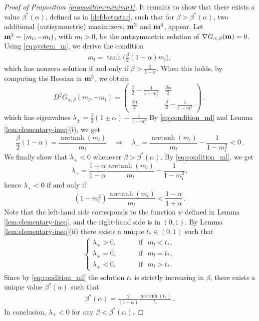 \documentclass[11pt,oneside]{amsart}
\numberwithin{equation}{section}  %
\theoremstyle{plain}
\theoremstyle{remark}
\def \bm {{\bf m}}
\begin{document}
\begin{proof}[Proof of Proposition \ref{proposition:minima1}]
It remains to show that there exists a value $\beta^*(\alpha)$, defined as in \eqref{def:betastar}, such that for $\beta > \beta^*(\alpha)$, two additional (antisymmetric) maximizers, $\bm^3$ and $\bm^4$, appear. 
Let $\bm^3=(m_l,-m_l)$, with $m_l>0$, be the antisymmetric solution of $\nabla G_{\alpha,\beta}(\bm)=0$. Using \eqref{eq:system_m}, we derive the condition
\begin{align}\label{eq:condition_ml}
    m_l=\tanh\!\Big(\frac{\beta}{2}(1-\alpha )m_l\Big),
\end{align}
which has nonzero solution if and only if $\beta > \frac{2}{1-\alpha}$. When this holds, by computing the Hessian in $\bm^3$, we obtain
$$
D^2G_{\alpha,\beta}( m_l, -m_l)=\begin{pmatrix}
        \frac{\beta}{2}-\frac{1}{1-m_l^2} & \frac{\beta \alpha}{2} \\
        \frac{\beta \alpha}{2} & \frac{\beta}{2}-\frac{1}{1-m_l^2}
    \end{pmatrix}\,,
$$
which has  eigenvalues $\lambda_{\pm}=\frac{\beta}{2} (1\pm \alpha)-\frac{1}{1-m_l^2}$
By \eqref{eq:condition_ml} and Lemma \ref{lem:elementary-ineq}(i), we get
$$
    \frac{\beta}{2}(1-\alpha)=\frac{\operatorname{arctanh}(m_l)}{m_l}
    \quad \Longrightarrow\quad
    \lambda_-=\frac{\operatorname{arctanh}(m_l)}{m_l}-\frac{1}{1-m_l^2}<0\,.
$$
We finally show that $\lambda_+<0$ whenever $\beta>\beta^*(\alpha)$. 
By \eqref{eq:condition_ml},  we get
$$ 
\lambda_+=\frac{1+\alpha}{1-\alpha} \frac{\operatorname{arctanh}(m_l)}{m_l}-\frac{1}{1-m_l^2},
$$
hence $\lambda_+<0$ if and only if
$$
    (1-m_l^2)\frac{\operatorname{arctanh}(m_l)}{m_l}<\frac{1-\alpha}{1+\alpha}\,.
$$
Note that the left-hand side corresponds to the function $\psi$ defined in Lemma \ref{lem:elementary-ineq}, and the right-hand side is in $(0,1)$. By Lemma \ref{lem:elementary-ineq}(ii) there exists a unique $t_* \in (0,1)$ such that 
\begin{align*}
    \begin{cases}
        \lambda_+>0, &\qquad \text{ if } \,\,m_l<t_*, \\
        \lambda_+=0, &\qquad \text{ if } \,\,m_l=t_*, \\
        \lambda_+<0, &\qquad \text{ if } \,\,m_l>t_*.
    \end{cases}
\end{align*}
Since by \eqref{eq:condition_ml} the solution $t_*$ is strictly increasing in $\beta$, there exists a unique value $\beta^*(\alpha)$ such that
\begin{align}\label{beta*}
\beta^*(\alpha)=\frac{2}{(1-\alpha)}\frac{\operatorname{arctanh}(t_*)}{t_*}\,.
\end{align}
In conclusion, $\lambda_+<0$ for any $\beta<\beta^*(\alpha)$.
\end{proof}
\end{document}
